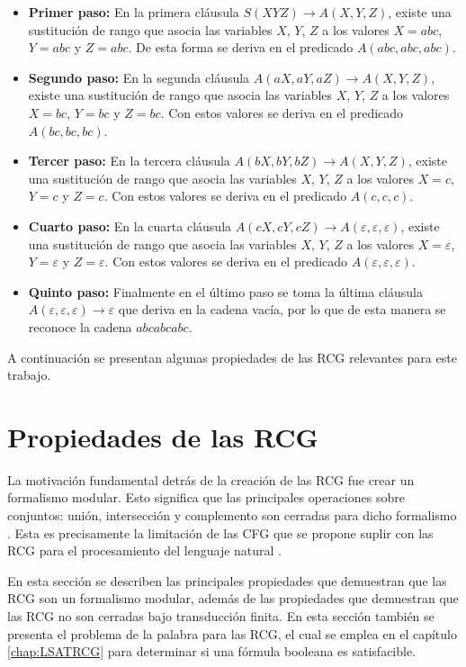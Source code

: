 \documentclass[12pt]{article}
\begin{document}
\begin{itemize}
    \item \textbf{Primer paso:} En la primera cláusula $S(XYZ)\to A(X,Y,Z)$, existe una sustitución de rango que asocia las variables $X$, $Y$, $Z$ a los valores $X=abc$, $Y=abc$ y $Z=abc$. De esta forma se deriva en el predicado $A(abc,abc,abc)$.
    \item \textbf{Segundo paso:} En la segunda cláusula $A(aX,aY,aZ)\to A(X,Y,Z)$, existe una sustitución de rango que asocia las
          variables $X$, $Y$, $Z$ a los valores $X=bc$, $Y=bc$ y $Z=bc$. Con estos valores se deriva en el predicado $A(bc,bc,bc)$.
    \item \textbf{Tercer paso:} En la tercera cláusula $A(bX,bY,bZ)\to A(X,Y,Z)$, existe una sustitución de rango que asocia las
          variables $X$, $Y$, $Z$ a los valores $X=c$, $Y=c$ y $Z=c$. Con estos valores se deriva en el predicado $A(c,c,c)$.
    \item \textbf{Cuarto paso:} En la cuarta cláusula $A(cX,cY,cZ)\to A(\varepsilon,\varepsilon,\varepsilon)$, existe una sustitución de rango que asocia las variables $X$, $Y$, $Z$ a los valores $X=\varepsilon$, $Y=\varepsilon$ y $Z=\varepsilon$. Con estos valores se deriva en el predicado $A(\varepsilon,\varepsilon,\varepsilon)$.
    \item \textbf{Quinto paso:} Finalmente en el último paso se toma la última
          cláusula $A(\varepsilon,\varepsilon,\varepsilon)\to \varepsilon$ que deriva en la cadena vacía, por lo que de esta manera se reconoce la cadena $abcabcabc$.
\end{itemize}


A continuación se presentan algunas propiedades de las RCG relevantes para este trabajo.

\section{Propiedades de las RCG}

La motivación fundamental detrás de la creación de las RCG fue crear un formalismo modular. Esto significa que las principales operaciones sobre conjuntos: unión, intersección y complemento son cerradas para dicho formalismo \cite{mainRCGBib}.  Esta es precisamente la limitación de las CFG que se propone suplir con las RCG para el procesamiento del lenguaje natural \cite{mainRCGBib}.

En esta sección se describen las principales propiedades que demuestran que las RCG son un formalismo
modular, además de las propiedades que demuestran que las RCG no son cerradas 
bajo transducción finita. En esta sección también se presenta el problema de la palabra 
para las RCG, el cual se emplea en el capítulo \ref{chap:LSATRCG} para determinar si una fórmula booleana es satisfacible.
\end{document}
